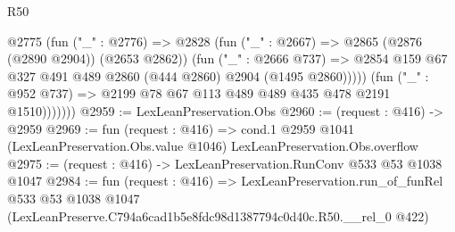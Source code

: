 \begin{lexlean}{R50}
\begin{coremodule}
                  @2775
                    (fun ("_" : @2776) =>
                    @2828
                      (fun ("_" : @2667) => @2865 (@2876 (@2890 @2904)) (@2653 @2862))
                      (fun ("_" : @2666 @737) =>
                      @2854 @159 @67 @327 @491 @489 @2860 (@444 @2860) @2904 (@1495 @2860)))))
                (fun ("_" : @952 @737) => @2199 @78 @67 @113 @489 @489 @435 @478 @2191 @1510)))))))
@2959 := LexLeanPreservation.Obs
@2960 := (request : @416) -> @2959
@2969 := fun (request : @416) =>
  cond.{1} @2959 @1041 (LexLeanPreservation.Obs.value @1046) LexLeanPreservation.Obs.overflow
@2975 := (request : @416) -> LexLeanPreservation.RunConv @533 @53 @1038 @1047
@2984 := fun (request : @416) =>
  LexLeanPreservation.run_of_funRel
    @533
    @53
    @1038
    @1047
    (LexLeanPreserve.C794a6cad1b5e8fdc98d1387794c0d40c.R50.__rel_0 @422)
\end{coremodule}
\end{lexlean}
